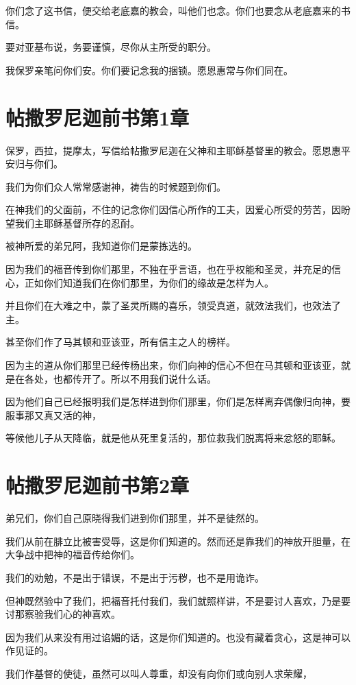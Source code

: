\documentclass[12pt,oneside]{book}
\begin{document}
你们念了这书信，便交给老底嘉的教会，叫他们也念。你们也要念从老底嘉来的书信。

要对亚基布说，务要谨慎，尽你从主所受的职分。

我保罗亲笔问你们安。你们要记念我的捆锁。愿恩惠常与你们同在。

\chapter{帖撒罗尼迦前书第1章}
保罗，西拉，提摩太，写信给帖撒罗尼迦在父神和主耶稣基督里的教会。愿恩惠平安归与你们。

我们为你们众人常常感谢神，祷告的时候题到你们。

在神我们的父面前，不住的记念你们因信心所作的工夫，因爱心所受的劳苦，因盼望我们主耶稣基督所存的忍耐。

被神所爱的弟兄阿，我知道你们是蒙拣选的。

因为我们的福音传到你们那里，不独在乎言语，也在乎权能和圣灵，并充足的信心，正如你们知道我们在你们那里，为你们的缘故是怎样为人。

并且你们在大难之中，蒙了圣灵所赐的喜乐，领受真道，就效法我们，也效法了主。

甚至你们作了马其顿和亚该亚，所有信主之人的榜样。

因为主的道从你们那里已经传杨出来，你们向神的信心不但在马其顿和亚该亚，就是在各处，也都传开了。所以不用我们说什么话。

因为他们自己已经报明我们是怎样进到你们那里，你们是怎样离弃偶像归向神，要服事那又真又活的神，

等候他儿子从天降临，就是他从死里复活的，那位救我们脱离将来忿怒的耶稣。

\chapter{帖撒罗尼迦前书第2章}
弟兄们，你们自己原晓得我们进到你们那里，并不是徒然的。

我们从前在腓立比被害受辱，这是你们知道的。然而还是靠我们的神放开胆量，在大争战中把神的福音传给你们。

我们的劝勉，不是出于错误，不是出于污秽，也不是用诡诈。

但神既然验中了我们，把福音托付我们，我们就照样讲，不是要讨人喜欢，乃是要讨那察验我们心的神喜欢。

因为我们从来没有用过谄媚的话，这是你们知道的。也没有藏着贪心，这是神可以作见证的。

我们作基督的使徒，虽然可以叫人尊重，却没有向你们或向别人求荣耀，
\end{document}
